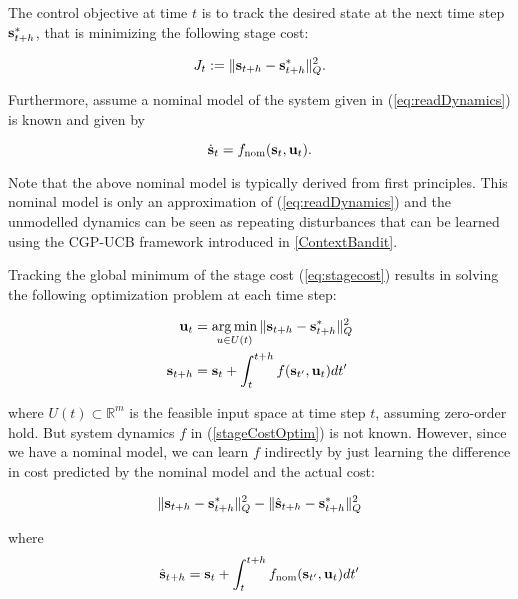 The control objective at time $t$ is to track the desired state at the next time step $\mathbf{s}^{*}_{t+h}$, that is minimizing the following stage cost:

\begin{equation}
J_{t} := \|\mathbf{s}_{t+h} - \mathbf{s}^{*}_{t+h}\|_{Q}^{2}. \label{eq:stagecost}
\end{equation}

Furthermore, assume a nominal model of the system given in (\ref{eq:readDynamics}) is known and given by

\begin{equation}
\dot{\mathbf{s}}_t = f_{\mathrm{nom}}(\mathbf{s}_t,\mathbf{u}_t) \label{nominal_model} \\.
\end{equation}

Note that the above nominal model is typically derived from first principles. This nominal model is only an approximation of (\ref{eq:readDynamics}) and the unmodelled dynamics can be seen as repeating disturbances that can be learned using the CGP-UCB framework introduced in \ref{ContextBandit}.

Tracking the global minimum of the stage cost (\ref{eq:stagecost}) results in solving the following optimization problem at each time step:

\begin{equation}
\begin{aligned}
\mathbf{u}_{t} &= \operatorname*{arg\,min}_{u \in U(t)}\|\mathbf{s}_{t+h} - \mathbf{s}^{*}_{t+h}\|_{Q}^{2} \\
\mathbf{s}_{t+h} &= \mathbf{s}_{t} + \int_{t}^{t+h}f(\mathbf{s}_{t'},\mathbf{u}_t)dt'
\end{aligned}
\label{stageCostOptim}
\end{equation}

where $U(t) \subset \mathbb{R}^m$ is the feasible input space at time step $t$, assuming zero-order hold. But system dynamics $f$ in (\ref{stageCostOptim}) is not known. However, since we have a nominal model, we can learn $f$ indirectly by just learning the difference in cost predicted by the nominal model and the actual cost:

\begin{equation}
\|\mathbf{s}_{t+h} - \mathbf{s}^{*}_{t+h}\|_{Q}^{2} - \|\hat{\mathbf{s}}_{t+h} - \mathbf{s}^{*}_{t+h}\|_{Q}^{2} \label{eq:deltaJ}
\end{equation}

where 
\begin{equation}
\hat{\mathbf{s}}_{t+h} = \mathbf{s}_{t} + \int_{t}^{t+h}f_{\mathrm{nom}}(\mathbf{s}_{t'},\mathbf{u}_t)dt' \label{eq:nominal_discrete}
\end{equation}

